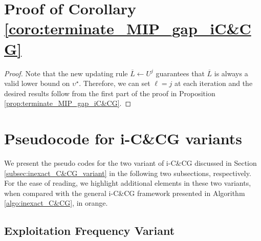 \documentclass[preprint,review,11pt]{elsarticle}
\theoremstyle{definition}
\theoremstyle{remark}
\newcommand{\Lbar}{\overline{L}}
\begin{document}
\section{Proof of Corollary \ref{coro:terminate_MIP_gap_iC&CG}} \label{appdx:proof_coro_terminate_MIP_gap_iC&CG}

\begin{proof}
Note that the new updating rule $\Lbar\leftarrow U^j$ guarantees that $\Lbar$ is always a valid lower bound on $\upsilon^\star$. Therefore, we can set $\ell=j$ at each iteration and the desired results follow from the first part of the proof in Proposition \ref{prop:terminate_MIP_gap_iC&CG}.
\end{proof}



\section{Pseudocode for i-C\&CG variants} \label{appdx:iCCG_variant}

We present the pseudo codes for the two variant of i-C\&CG discussed in Section \ref{subsec:inexact_C&CG_variant} in the following two subsections, respectively. For the ease of reading, we highlight additional elements in these two variants, when compared with the general i-C\&CG framework presented in Algorithm \ref{algo:inexact_C&CG}, in orange.


\subsection{Exploitation Frequency Variant}
\end{document}
